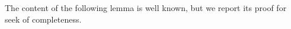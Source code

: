 \documentclass[a4paper,11pt]{article}
\numberwithin{equation}{section}
\newcommand{\eps}{\varepsilon}
\newcommand{\Om}{\Omega}
\newcommand{\rom}{\mathrm}
\theoremstyle{definition}
\begin{document}

The content of the following lemma is well known, but we report its proof for seek of completeness.
\end{document}
